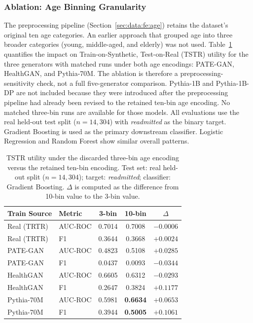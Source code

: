 \subsubsection{Ablation: Age Binning Granularity}
\label{sec:results:rq2:utility:age-binning}

The preprocessing pipeline (Section~\ref{sec:data:fe:age}) retains the
dataset's original ten age categories. An earlier approach that grouped
age into three broader categories (young, middle-aged, and elderly) was
not used. Table~\ref{tab:age-binning-tstr} quantifies the impact on
Train-on-Synthetic, Test-on-Real (TSTR) utility for the three generators
with matched runs under both age encodings: PATE-GAN, HealthGAN, and
Pythia-70M. The ablation is therefore a preprocessing-sensitivity check,
not a full five-generator comparison. Pythia-1B and Pythia-1B-DP are not
included because they were introduced after the preprocessing pipeline had
already been revised to the retained ten-bin age encoding. No matched
three-bin runs are available for those models. All evaluations use the
real held-out test split ($n = 14{,}304$) with \emph{readmitted} as the
binary target. Gradient Boosting is used as the primary downstream classifier.
Logistic Regression and Random Forest show similar overall patterns.
\vspace{0.5em}

\begin{table}[H]
\centering
\small
\caption{TSTR utility under the discarded three-bin age encoding versus
the retained ten-bin encoding. Test set: real held-out split
($n = 14{,}304$); target: \emph{readmitted}; classifier: Gradient
Boosting. $\Delta$ is computed as the difference from 10-bin value to the 3-bin
value.}
\label{tab:age-binning-tstr}
\begin{tabular}{llccc}
\toprule
Train Source & Metric & 3-bin & 10-bin & $\Delta$ \\
\midrule
Real (TRTR) & AUC-ROC & 0.7014 & 0.7008 & $-0.0006$ \\
Real (TRTR) & F1      & 0.3644 & 0.3668 & $+0.0024$ \\
\midrule
PATE-GAN    & AUC-ROC & 0.4823 & 0.5108 & $+0.0285$ \\
PATE-GAN    & F1      & 0.0437 & 0.0093 & $-0.0344$ \\
HealthGAN   & AUC-ROC & 0.6605 & 0.6312 & $-0.0293$ \\
HealthGAN   & F1      & 0.2647 & 0.3824 & $+0.1177$ \\
Pythia-70M  & AUC-ROC & 0.5981 & \textbf{0.6634} & $\mathbf{+0.0653}$ \\
Pythia-70M  & F1      & 0.3944 & \textbf{0.5005} & $\mathbf{+0.1061}$ \\
\bottomrule
\end{tabular}
\end{table}


